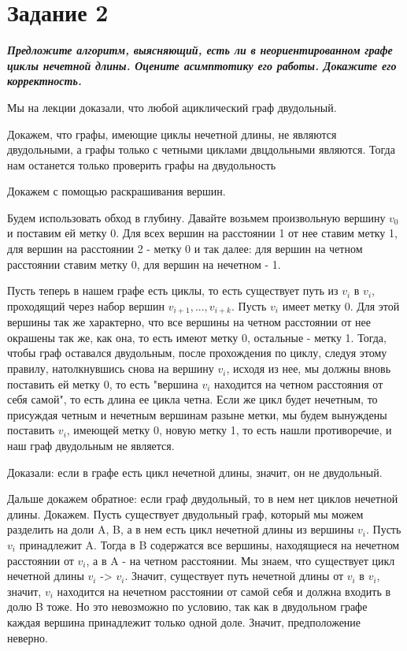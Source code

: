 \documentclass{article}
\begin{document}
\bigskip

\section*{\textbf{Задание 2}} \textbf{\textit{Предложите алгоритм, выясняющий, есть ли в неориентированном графе циклы нечетной длины. Оцените асимптотику его работы. Докажите его корректность.}}

Мы на лекции доказали, что любой ациклический граф двудольный. 

Докажем, что графы, имеющие циклы нечетной длины, не являются двудольными, а графы только с четными циклами двцдольными являются. Тогда нам останется только проверить графы на двудольность 

Докажем с помощью раскрашивания вершин.

Будем использовать обход в глубину. Давайте возьмем произвольную вершину $v_0$ и поставим ей метку 0. Для всех вершин на расстоянии 1 от нее ставим метку 1, для вершин на расстоянии 2 - метку 0 и так далее: для вершин на четном расстоянии ставим метку 0, для вершин на нечетном - 1.

Пусть теперь в нашем графе есть циклы, то есть существует путь из $v_i$ в $v_i$, проходящий через набор вершин $v_{i+1}, ..., v_{i+k}$. Пусть $v_i$ имеет метку 0. Для этой вершины так же характерно, что все вершины на четном расстоянии от нее окрашены так же, как она, то есть имеют метку 0, остальные - метку 1. Тогда, чтобы граф оставался двудольным, после прохождения по циклу, следуя этому правилу, натолкнувшись снова на вершину $v_i$, исходя из нее, мы должны вновь поставить ей метку 0, то есть "вершина $v_i$ находится на четном расстояния от себя самой", то есть длина ее цикла четна. Если же цикл будет нечетным, то присуждая четным и нечетным вершинам разыне метки, мы будем вынуждены поставить  $v_i$, имеющей метку 0, новую метку 1, то есть нашли противоречие, и наш граф двудольным не является. 

Доказали: если в графе есть цикл нечетной длины, значит, он не двудольный.

Дальше докажем обратное: если граф двудольный, то в нем нет циклов нечетной длины. Докажем. Пусть существует двудольный граф, который мы можем разделить на доли A, B, а в нем есть цикл нечетной длины из вершины $v_i$. Пусть $v_i$ принадлежит A. Тогда в B содержатся все вершины, находящиеся на нечетном расстоянии от $v_i$, а в A - на четном расстоянии. Мы знаем, что существует цикл нечетной длины $v_i$ -> $v_i$. Значит, существует путь нечетной длины от $v_i$ в $v_i$, значит, $v_i$ находится на нечетном расстоянии от самой себя и должна входить в долю B тоже. Но это невозможно по условию, так как в двудольном графе каждая вершина принадлежит только одной доле. Значит, предположение неверно.
\end{document}
